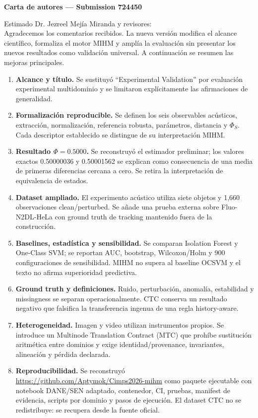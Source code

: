 \documentclass[11pt]{article}
\begin{document}
\begin{center}\Large\textbf{Carta de autores --- Submission 724450}\end{center}
\noindent Estimado Dr. Jezreel Mejía Miranda y revisores:\\
Agradecemos los comentarios recibidos. La nueva versión modifica el alcance científico, formaliza el motor MIHM y amplía la evaluación sin presentar los nuevos resultados como validación universal. A continuación se resumen las mejoras principales.
\begin{enumerate}[leftmargin=*]
\item \textbf{Alcance y título.} Se sustituyó ``Experimental Validation'' por evaluación experimental multidominio y se limitaron explícitamente las afirmaciones de generalidad.
\item \textbf{Formalización reproducible.} Se definen los seis observables acústicos, extracción, normalización, referencia robusta, parámetros, distancia y $\Phi_S$. Cada descriptor establecido se distingue de su interpretación MIHM.
\item \textbf{Resultado $\Phi=0.5000$.} Se reconstruyó el estimador preliminar; los valores exactos 0.50000036 y 0.50001562 se explican como consecuencia de una media de primeras diferencias cercana a cero. Se retira la interpretación de equivalencia de estados.
\item \textbf{Dataset ampliado.} El experimento acústico utiliza siete objetos y 1,660 observaciones clean/perturbed. Se añade una prueba externa sobre Fluo-N2DL-HeLa con ground truth de tracking mantenido fuera de la construcción.
\item \textbf{Baselines, estadística y sensibilidad.} Se comparan Isolation Forest y One-Class SVM; se reportan AUC, bootstrap, Wilcoxon/Holm y 900 configuraciones de sensibilidad. MIHM no supera al baseline OCSVM y el texto no afirma superioridad predictiva.
\item \textbf{Ground truth y definiciones.} Ruido, perturbación, anomalía, estabilidad y missingness se separan operacionalmente. CTC conserva un resultado negativo que falsifica la transferencia ingenua de una regla history-aware.
\item \textbf{Heterogeneidad.} Imagen y video utilizan instrumentos propios. Se introduce un Multinode Translation Contract (MTC) que prohíbe sustitución aritmética entre dominios y exige identidad/provenance, invariantes, alineación y pérdida declarada.
\item \textbf{Reproducibilidad.} Se reconstruyó \url{https://github.com/Aptymok/Cimps2026-mihm} como paquete ejecutable con notebook DANE/SEN adaptado, contenedor, CI, pruebas, manifest de evidencia, scripts por dominio y pasos de ejecución. El dataset CTC no se redistribuye: se recupera desde la fuente oficial.

\end{enumerate}
\end{document}
